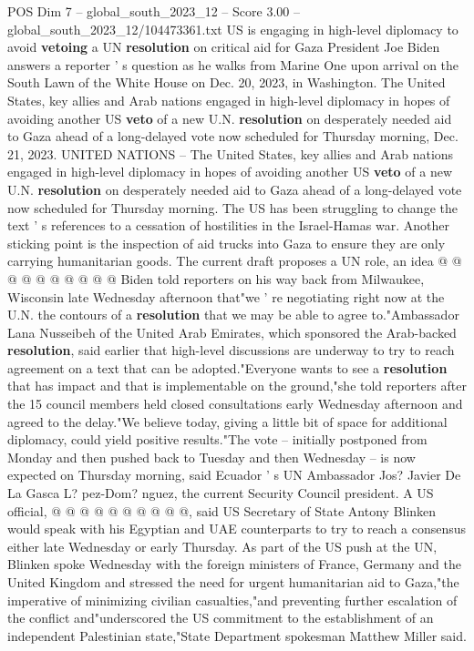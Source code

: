 \begin{textsample}{POS Dim 7 – global\_south\_2023\_12 – Score 3.00 – global\_south\_2023\_12/104473361.txt}  \label{ex:f7_pos_037}
US is engaging in high-level diplomacy to avoid \textbf{vetoing} a UN \textbf{resolution} on critical aid for Gaza President Joe Biden answers a reporter ' s question as he walks from Marine One upon arrival on the South Lawn of the White House on Dec. 20, 2023, in Washington.
The United States, key allies and Arab nations engaged in high-level diplomacy in hopes of avoiding another US \textbf{veto} of a new U.N. \textbf{resolution} on desperately needed aid to Gaza ahead of a long-delayed vote now scheduled for Thursday morning, Dec. 21, 2023.
UNITED NATIONS -- The United States, key allies and Arab nations engaged in high-level diplomacy in hopes of avoiding another US \textbf{veto} of a new U.N. \textbf{resolution} on desperately needed aid to Gaza ahead of a long-delayed vote now scheduled for Thursday morning.
The US has been struggling to change the text ' s references to a cessation of hostilities in the Israel-Hamas war.
Another sticking point is the inspection of aid trucks into Gaza to ensure they are only carrying humanitarian goods.
The current draft proposes a UN role, an idea @ @ @ @ @ @ @ @ @ @ Biden told reporters on his way back from Milwaukee, Wisconsin late Wednesday afternoon that"we ' re negotiating right now at the U.N. the contours of a \textbf{resolution} that we may be able to agree to."Ambassador Lana Nusseibeh of the United Arab Emirates, which sponsored the Arab-backed \textbf{resolution}, said earlier that high-level discussions are underway to try to reach agreement on a text that can be adopted."Everyone wants to see a \textbf{resolution} that has impact and that is implementable on the ground,"she told reporters after the 15 council members held closed consultations early Wednesday afternoon and agreed to the delay."We believe today, giving a little bit of space for additional diplomacy, could yield positive results."The vote -- initially postponed from Monday and then pushed back to Tuesday and then Wednesday -- is now expected on Thursday morning, said Ecuador ' s UN Ambassador Jos?
Javier De La Gasca L? pez-Dom? nguez, the current Security Council president.
A US official, @ @ @ @ @ @ @ @ @ @, said US Secretary of State Antony Blinken would speak with his Egyptian and UAE counterparts to try to reach a consensus either late Wednesday or early Thursday.
As part of the US push at the UN, Blinken spoke Wednesday with the foreign ministers of France, Germany and the United Kingdom and stressed the need for urgent humanitarian aid to Gaza,"the imperative of minimizing civilian casualties,"and preventing further escalation of the conflict and"underscored the US commitment to the establishment of an independent Palestinian state,"State Department spokesman Matthew Miller said.

\end{textsample}
